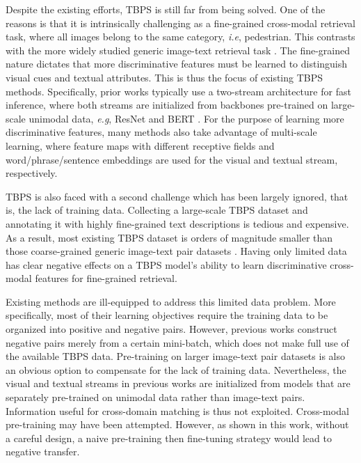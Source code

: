 \documentclass{bmvc2k}
\def\ie{\emph{i.e}\bmvaOneDot}
\def\eg{\emph{e.g}\bmvaOneDot}
\begin{document}
Despite the existing efforts, TBPS is still far from being solved.
One of the reasons is that it is intrinsically challenging as a fine-grained cross-modal retrieval task, where all images belong to the same category, \ie, pedestrian. 
This contrasts with the more widely studied generic image-text retrieval task \cite{chen2020uniter, tan2019lxmert, sun2021lightningdot, li2020oscar}.
The fine-grained nature dictates that more discriminative features must be learned to distinguish visual cues and textual attributes.
This is thus the focus of existing TBPS methods. 
Specifically, prior works \cite{aggarwal2020cmaam,chen2021cmka,gao2021contextual,jing2020pose,sarafianos2019adversarial} typically use a two-stream architecture for fast inference, where both streams are initialized from backbones pre-trained on large-scale unimodal data, \eg, ResNet \cite{he2016resnet} and BERT \cite{devlin2018bert}. 
For the purpose of learning more discriminative features, many methods \cite{aggarwal2020cmaam,gao2021contextual,jing2020pose,wang2020vitaa,zheng2020hierarchical} also take advantage of multi-scale learning, where feature maps with different receptive fields and word/phrase/sentence embeddings are used for the visual and textual stream, respectively.

TBPS is also faced with a second challenge which has been largely ignored, that is, the lack of training data.  
Collecting a large-scale TBPS dataset and annotating it with highly fine-grained text descriptions is tedious and expensive. 
As a result, most existing TBPS dataset is orders of magnitude smaller than those coarse-grained generic image-text pair datasets \cite{chen2020uniter,li2020oscar}.
Having only limited data has clear negative effects on a TBPS model's ability to learn discriminative cross-modal features for fine-grained retrieval. 

Existing methods \cite{aggarwal2020cmaam,chen2021cmka,gao2021contextual,jing2020pose,sarafianos2019adversarial} are ill-equipped to address this limited data problem. 
More specifically, most of their learning objectives require the training data to be organized into positive and negative pairs.
However, previous works construct negative pairs merely from a certain mini-batch, which does not make full use of the available TBPS data. 
Pre-training on larger image-text pair datasets is also an obvious option to compensate for the lack of training data.  
Nevertheless, the visual and textual streams in previous works are initialized from models that are separately pre-trained on unimodal data rather than image-text pairs. 
Information useful for cross-domain matching is thus not exploited. 
Cross-modal pre-training may have been attempted. 
However, as shown in this work, without a careful design, a naive pre-training then fine-tuning strategy would lead to negative transfer.   
\end{document}
